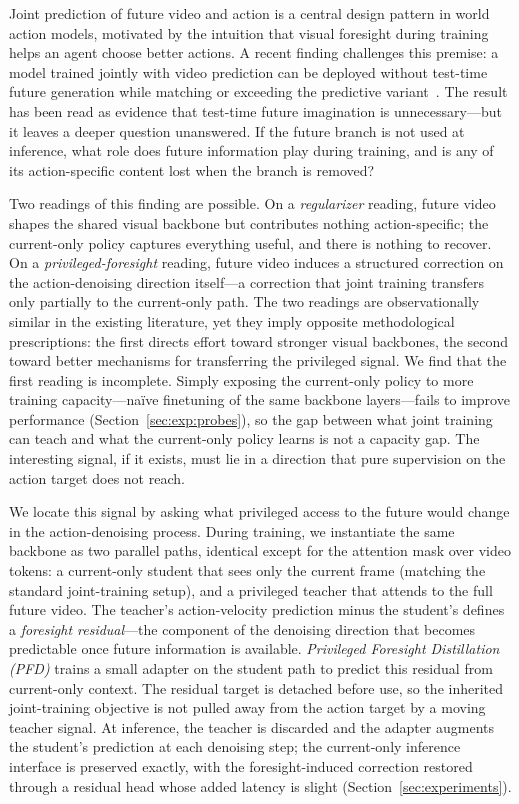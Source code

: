 \documentclass{article}
\begin{document}
Joint prediction of future video and action is a central design pattern in world action models, motivated by the intuition that visual foresight during training helps an agent choose better actions. A recent finding challenges this premise: a model trained jointly with video prediction can be deployed without test-time future generation while matching or exceeding the predictive variant~\citep{yuan2026fastwam}. The result has been read as evidence that test-time future imagination is unnecessary---but it leaves a deeper question unanswered. If the future branch is not used at inference, what role does future information play during training, and is any of its action-specific content lost when the branch is removed?

Two readings of this finding are possible. On a \emph{regularizer} reading, future video shapes the shared visual backbone but contributes nothing action-specific; the current-only policy captures everything useful, and there is nothing to recover. On a \emph{privileged-foresight} reading, future video induces a structured correction on the action-denoising direction itself---a correction that joint training transfers only partially to the current-only path. The two readings are observationally similar in the existing literature, yet they imply opposite methodological prescriptions: the first directs effort toward stronger visual backbones, the second toward better mechanisms for transferring the privileged signal. We find that the first reading is incomplete. Simply exposing the current-only policy to more training capacity---na\"ive finetuning of the same backbone layers---fails to improve performance (Section~\ref{sec:exp:probes}), so the gap between what joint training can teach and what the current-only policy learns is not a capacity gap. The interesting signal, if it exists, must lie in a direction that pure supervision on the action target does not reach.

We locate this signal by asking what privileged access to the future would change in the action-denoising process. During training, we instantiate the same backbone as two parallel paths, identical except for the attention mask over video tokens: a current-only student that sees only the current frame (matching the standard joint-training setup), and a privileged teacher that attends to the full future video. The teacher's action-velocity prediction minus the student's defines a \emph{foresight residual}---the component of the denoising direction that becomes predictable once future information is available. \emph{Privileged Foresight Distillation (PFD)} trains a small adapter on the student path to predict this residual from current-only context. The residual target is detached before use, so the inherited joint-training objective is not pulled away from the action target by a moving teacher signal. At inference, the teacher is discarded and the adapter augments the student's prediction at each denoising step; the current-only inference interface is preserved exactly, with the foresight-induced correction restored through a residual head whose added latency is slight (Section~\ref{sec:experiments}).
\end{document}
